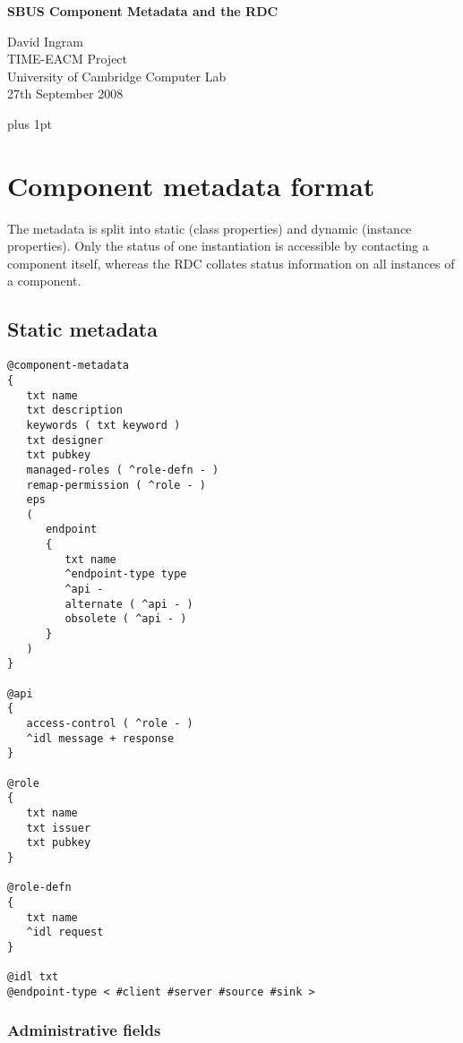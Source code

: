 \documentclass[12pt,a4paper,twoside]{article}
\renewcommand{\_}{\texttt{\symbol{95}}}
\begin{document}
\centerline{\textbf{\LARGE SBUS Component Metadata and the RDC}}
\begin{center} \large
David Ingram\\
TIME-EACM Project\\
University of Cambridge Computer Lab\\
27th September 2008\\
\end{center}

{ \parskip 1mm plus 1pt \tableofcontents }
\pagestyle{fancy}

\section{Component metadata format}

The metadata is split into static (class properties) and dynamic
(instance properties). Only the status of one instantiation is
accessible by contacting a component itself, whereas the RDC
collates status information on all instances of a component.


\newpage
\subsection{Static metadata}
\label{metadata}

\begin{verbatim}
@component-metadata
{
   txt name
   txt description
   keywords ( txt keyword )
   txt designer
   txt pubkey
   managed-roles ( ^role-defn - )
   remap-permission ( ^role - )
   eps
   (
      endpoint
      {
         txt name
         ^endpoint-type type
         ^api -
         alternate ( ^api - )
         obsolete ( ^api - )
      }
   )
}

@api
{
   access-control ( ^role - )
   ^idl message + response
}

@role
{
   txt name
   txt issuer
   txt pubkey
}

@role-defn
{
   txt name
   ^idl request
}

@idl txt
@endpoint-type < #client #server #source #sink >
\end{verbatim}

\subsubsection{Administrative fields}
\end{document}
